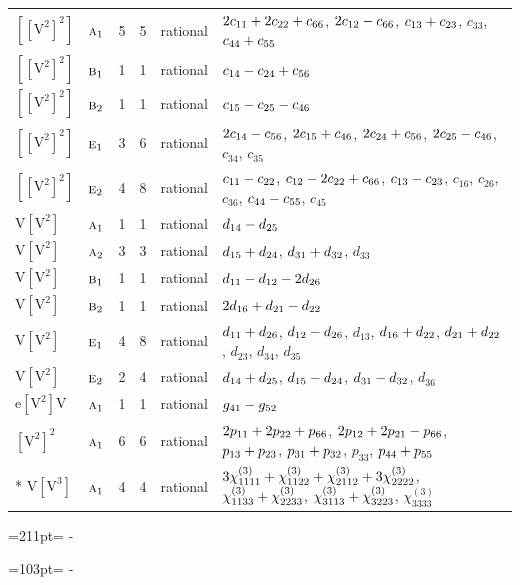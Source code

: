 \documentclass[10pt,a4paper]{article}
\newcommand{\needspace}[1]{\par\penalty-100\begingroup\dimen0=#1\relax\dimen2=\pagegoal
  \advance\dimen2-\pagetotal\ifdim\dimen0>\dimen2\relax\ifdim\dimen2>0pt\vfil\break\fi\fi
  \endgroup}
\numberwithin{equation}{section}
\newcommand{\irr}[1]{\text{\normalfont\scshape #1}}
\newcommand{\jahn}[1]{\mathrm{#1}}
\newlength{\fillwidth}\newlength{\cellwidth}\newlength{\colwidth}
\newcommand{\signbreak}{\penalty100\relax}
\begin{document}
{\begin{longtable}{@{}llrrl>{\RaggedRight\arraybackslash}p{\fillwidth}@{}}
$\jahn{[[V^{2}]^{2}]}$ & $\irr{a}_{1}$ & 5 & 5 & rational & $2c_{11} +\signbreak 2c_{22} +\signbreak c_{66}$, $2c_{12} -\signbreak c_{66}$, $c_{13} +\signbreak c_{23}$, $c_{33}$, $c_{44} +\signbreak c_{55}$\\
$\jahn{[[V^{2}]^{2}]}$ & $\irr{b}_{1}$ & 1 & 1 & rational & $c_{14} -\signbreak c_{24} +\signbreak c_{56}$\\
$\jahn{[[V^{2}]^{2}]}$ & $\irr{b}_{2}$ & 1 & 1 & rational & $c_{15} -\signbreak c_{25} -\signbreak c_{46}$\\
$\jahn{[[V^{2}]^{2}]}$ & $\irr{e}_{1}$ & 3 & 6 & rational & $2c_{14} -\signbreak c_{56}$, $2c_{15} +\signbreak c_{46}$, $2c_{24} +\signbreak c_{56}$, $2c_{25} -\signbreak c_{46}$, $c_{34}$, $c_{35}$\\
$\jahn{[[V^{2}]^{2}]}$ & $\irr{e}_{2}$ & 4 & 8 & rational & $c_{11} -\signbreak c_{22}$, $c_{12} -\signbreak 2c_{22} +\signbreak c_{66}$, $c_{13} -\signbreak c_{23}$, $c_{16}$, $c_{26}$, $c_{36}$, $c_{44} -\signbreak c_{55}$, $c_{45}$\\
$\jahn{V[V^{2}]}$ & $\irr{a}_{1}$ & 1 & 1 & rational & $d_{14} -\signbreak d_{25}$\\
$\jahn{V[V^{2}]}$ & $\irr{a}_{2}$ & 3 & 3 & rational & $d_{15} +\signbreak d_{24}$, $d_{31} +\signbreak d_{32}$, $d_{33}$\\
$\jahn{V[V^{2}]}$ & $\irr{b}_{1}$ & 1 & 1 & rational & $d_{11} -\signbreak d_{12} -\signbreak 2d_{26}$\\
$\jahn{V[V^{2}]}$ & $\irr{b}_{2}$ & 1 & 1 & rational & $2d_{16} +\signbreak d_{21} -\signbreak d_{22}$\\
$\jahn{V[V^{2}]}$ & $\irr{e}_{1}$ & 4 & 8 & rational & $d_{11} +\signbreak d_{26}$, $d_{12} -\signbreak d_{26}$, $d_{13}$, $d_{16} +\signbreak d_{22}$, $d_{21} +\signbreak d_{22}$, $d_{23}$, $d_{34}$, $d_{35}$\\
$\jahn{V[V^{2}]}$ & $\irr{e}_{2}$ & 2 & 4 & rational & $d_{14} +\signbreak d_{25}$, $d_{15} -\signbreak d_{24}$, $d_{31} -\signbreak d_{32}$, $d_{36}$\\
$\jahn{e[V^{2}]V}$ & $\irr{a}_{1}$ & 1 & 1 & rational & $\mathnormal{g}_{41} -\signbreak \mathnormal{g}_{52}$\\
$\jahn{[V^{2}]^{2}}$ & $\irr{a}_{1}$ & 6 & 6 & rational & $2p_{11} +\signbreak 2p_{22} +\signbreak p_{66}$, $2p_{12} +\signbreak 2p_{21} -\signbreak p_{66}$, $p_{13} +\signbreak p_{23}$, $p_{31} +\signbreak p_{32}$, $p_{33}$, $p_{44} +\signbreak p_{55}$\\*
$\jahn{V[V^{3}]}$ & $\irr{a}_{1}$ & 4 & 4 & rational & $3\chi^{(3)}_{1111} +\signbreak \chi^{(3)}_{1122} +\signbreak \chi^{(3)}_{2112} +\signbreak 3\chi^{(3)}_{2222}$, $\chi^{(3)}_{1133} +\signbreak \chi^{(3)}_{2233}$, $\chi^{(3)}_{3113} +\signbreak \chi^{(3)}_{3223}$, $\chi^{(3)}_{3333}$\\
\bottomrule\end{longtable}}
\needspace{211pt}
\needspace{103pt}
\end{document}
